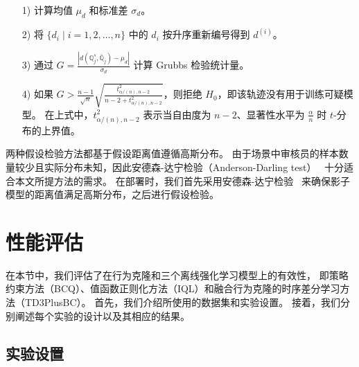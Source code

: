 \begin{itemize}
    \setlength{\itemsep}{0pt}
    \setlength{\parsep}{0pt}
    \setlength{\parskip}{0pt}
    \item [1)] 计算均值 $\mu_{d}$ 和标准差 $\sigma_{d}$。
    \item [2)] 将 $\{d_i \mid i=1,2,\dots,n \}$ 中的 $d_i$ 按升序重新编号得到 $d^{(i)}$。
    \item [3)] 通过 $G=\frac{|d(\mathbb{Q}_j^s, \bar{\mathbb{Q}}_j)-\mu_{d}|}{\sigma_{d}}$ 计算 Grubbs 检验统计量。
    \item [4)] 如果 $G>\frac{n-1}{\sqrt{n}} \sqrt{\frac{t_{\alpha /(n), n-2}^2}{n-2+t_{\alpha /(n), n-2}^2}}$，则拒绝 $H_0$，即该轨迹没有用于训练可疑模型。
    在上式中，$t_{\alpha /(n), n-2}^2$ 表示当自由度为 $n-2$、显著性水平为 $\frac{\alpha}{n}$ 时 $t$-分布的上界值。
\end{itemize}

两种假设检验方法都基于假设距离值遵循高斯分布。
由于\sysnameo 场景中审核员的样本数量较少且实际分布未知，因此安德森-达宁检验（Anderson-Darling test）~\cite{stephens1974edf} 十分适合本文所提方法的需求。
在部署\sysnameo 时，我们首先采用安德森-达宁检验~\cite{stephens1974edf} 来确保影子模型的距离值满足高斯分布，之后进行假设检验。


\section{性能评估}
\label{sec:orl evaluation}
在本节中，我们评估了\sysname 在行为克隆和三个离线强化学习模型上的有效性，
即策略约束方法（BCQ）\cite{DBLP:conf/icml/FujimotoMP19}、值函数正则化方法（IQL）\cite{DBLP:conf/iclr/KostrikovNL22}和融合行为克隆的时序差分学习方法（TD3PlusBC）\cite{DBLP:conf/nips/FujimotoG21}。
首先，我们介绍所使用的数据集和实验设置。
接着，我们分别阐述每个实验的设计以及其相应的结果。
\subsection{实验设置}
\label{sec:orl experimental setup}
